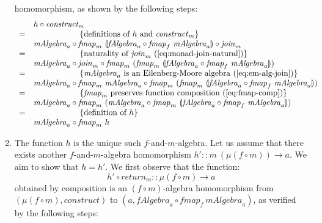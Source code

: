 \documentclass{jfp1}
\newcommand{\fold}[1]{\llparenthesis #1 \rrparenthesis}
\newcommand{\eqAnnotation}[1]{\hspace{2cm}\left\{\textrm{#1}\right\}}
\begin{document}
\begin{proof*}
\begin{enumerate}
    homomorphism, as shown by the following steps:
    \begin{displaymath}
      \begin{array}{cl}
        & h \circ \mathit{construct_m} \\
        =&\eqAnnotation{definitions of $h$ and $\mathit{construct}_m$} \\
         &\mathit{mAlgebra}_a \circ \mathit{fmap}_m~\fold{\mathit{fAlgebra}_a \circ \mathit{fmap}_f~\mathit{mAlgebra}_a} \circ \mathit{join}_m \\
        =&\eqAnnotation{naturality of $\mathit{join}_m$ (\autoref{eq:monad-join-natural})} \\
         &\mathit{mAlgebra}_a \circ \mathit{join}_m \circ \mathit{fmap}_m~(\mathit{fmap}_m~\fold{\mathit{fAlgebra}_a \circ \mathit{fmap}_f~\mathit{mAlgebra}_a}) \\
        =&\eqAnnotation{$\mathit{mAlgebra}_a$ is an Eilenberg-Moore algebra (\autoref{eq:em-alg-join})} \\
         &\mathit{mAlgebra}_a \circ \mathit{fmap}_m~\mathit{mAlgebra}_a \circ \mathit{fmap}_m~(\mathit{fmap}_m~\fold{\mathit{fAlgebra}_a \circ \mathit{fmap}_f~\mathit{mAlgebra}_a}) \\
        =&\eqAnnotation{$\mathit{fmap}_m$ preserves function composition (\autoref{eq:fmap-comp})} \\
         &\mathit{mAlgebra}_a \circ \mathit{fmap}_m~(\mathit{mAlgebra}_a \circ \mathit{fmap}_m~\fold{\mathit{fAlgebra}_a \circ \mathit{fmap}_f~\mathit{mAlgebra}_a}) \\
        =&\eqAnnotation{definition of $h$} \\
         &\mathit{mAlgebra}_a \circ \mathit{fmap}_m~h
      \end{array}
    \end{displaymath}
  \item The function $h$ is the unique such $f$-and-$m$-algebra. Let
    us assume that there exists another $f$-and-$m$-algebra
    homomorphism $h' :: m~(\mu(f \circ m)) \to a$. We aim to show that
    $h = h'$. We first observe that the function:
    \begin{displaymath}
      h' \circ \mathit{return}_m :: \mu(f \circ m) \to a
    \end{displaymath}
    obtained by composition is an $(f \circ m)$-algebra homomorphism
    from $(\mu(f \circ m), \mathit{construct})$ to $(a, \mathit{fAlgebra}_a
    \circ \mathit{fmap}_f~\mathit{mAlgebra}_a)$, as verified by the
    following steps:
    \begin{displaymath}

\end{displaymath}
\end{enumerate}
\end{proof*}
\end{document}
